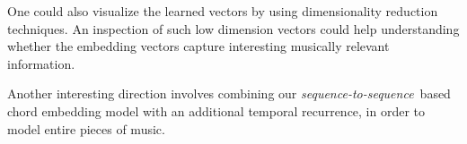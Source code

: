 \documentclass{article}
\newcommand{\seqtoseq}{\textit{sequence-to-sequence}}
\begin{document}
One could also visualize the learned vectors by using dimensionality reduction techniques. An inspection of such low dimension vectors could help understanding whether the embedding vectors capture interesting musically relevant information.

Another interesting direction involves combining our \seqtoseq\ based chord embedding model with an additional temporal recurrence, in order to model entire pieces of music.


 
\end{document}
